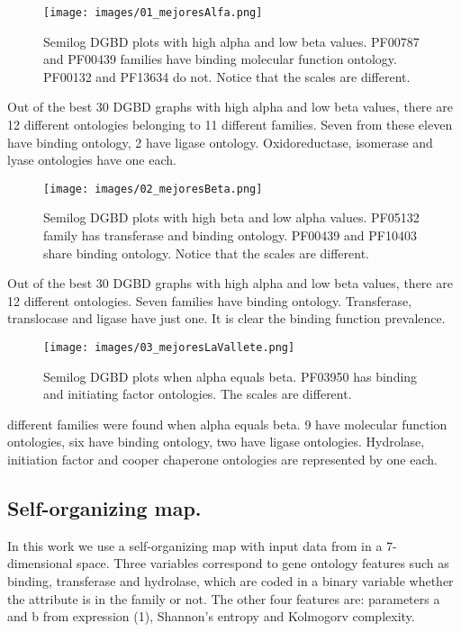 \documentclass[preprint,12pt]{elsarticle}
\begin{document}
\begin{figure} %
    \centering
    \texttt{[image: images/01\_mejoresAlfa.png]}
    \caption{Semilog DGBD plots with high alpha and low beta values. PF00787 and PF00439 families have binding molecular function ontology. PF00132 and PF13634 do not. Notice that the scales are different.}
    \label{fig:alpha}
\end{figure}
\bigbreak
Out of the best 30 DGBD graphs with high alpha and low beta values, there are 12 different ontologies belonging to 11 different families. Seven from these eleven have binding ontology, 2 have ligase ontology. Oxidoreductase, isomerase and lyase ontologies have one each.


\begin{figure} %
    \centering
    \texttt{[image: images/02\_mejoresBeta.png]}
    \bigbreak
    \caption {Semilog DGBD plots with high beta and low alpha values. PF05132 family has transferase and binding ontology. PF00439 and PF10403 share binding ontology. Notice that the scales are different.}
    \label{fig:beta}
\end{figure}
\bigbreak
Out of the best 30 DGBD graphs with high alpha and low beta values, there are 12 different ontologies. Seven families have binding ontology. Transferase, translocase and ligase have just one. It is clear the binding function prevalence.


\begin{figure} %
    \centering
    \texttt{[image: images/03\_mejoresLaVallete.png]}
    \bigbreak
    \caption {Semilog DGBD plots when alpha equals beta. PF03950 has binding and initiating factor ontologies. The scales are different.}
    \label{fig:alphabeta}
\end{figure}
 different families were found when alpha equals beta. 9 have molecular function ontologies, six have binding ontology, two have ligase ontologies. Hydrolase, initiation factor and cooper chaperone ontologies are represented by one each.



\subsection{\textbf{Self-organizing map.}}

In this work we use a self-organizing map with input data from in a 7-dimensional space. Three variables correspond to gene ontology features such as binding, transferase and hydrolase, which are coded in a binary variable whether the attribute is in the family or not. The other four features are: parameters a and b from expression (1),  Shannon’s entropy and Kolmogorv complexity.
\end{document}
